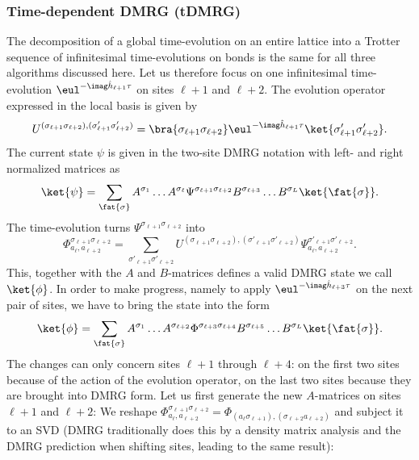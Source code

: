 \subsubsection{Time-dependent DMRG (tDMRG)}
The decomposition of a global time-evolution on an entire lattice into a Trotter sequence of infinitesimal time-evolutions on bonds is the same for all three algorithms discussed here.
Let us therefore focus on one infinitesimal time-evolution $\eul^{-\imag  \hat{h}_{\ell+1} \tau}$ on sites $\ell+1$ and $\ell+2$. 
The evolution operator expressed in the local basis is given by
\begin{equation}
U^{(\sigma_{\ell+1} \sigma_{\ell+2}), (\sigma'_{\ell+1} \sigma'_{\ell+2})} = \bra{\sigma_{\ell+1} \sigma_{\ell+2}} \eul^{-\imag  \hat{h}_{\ell+1} \tau} \ket{\sigma'_{\ell+1} \sigma'_{\ell+2}} .
\end{equation}
The current state $\psi$ is given in the two-site DMRG notation with left- and right normalized matrices as
\begin{equation}
\ket{\psi} = \sum_{\fat{\sigma}} A^{\sigma_1} \ldots A^{\sigma_\ell} \Psi^{\sigma_{\ell+1}\sigma_{\ell+2}} B^{\sigma_{\ell+3}} \ldots B^{\sigma_L} \ket{\fat{\sigma}} .
\end{equation}
The time-evolution turns $\Psi^{\sigma_{\ell+1}\sigma_{\ell+2}}$ into
\begin{equation}
\Phi^{\sigma_{\ell+1}\sigma_{\ell+2}}_{a_\ell, a_{\ell+2}} = \sum_{\sigma'_{\ell+1} \sigma'_{\ell+2}}
U^{(\sigma_{\ell+1} \sigma_{\ell+2}), (\sigma'_{\ell+1} \sigma'_{\ell+2})}  \Psi^{\sigma'_{\ell+1}\sigma'_{\ell+2}}_{a_\ell, a_{\ell+2}} . 
\end{equation} 
This, together with the $A$ and $B$-matrices defines a valid DMRG state we call $\ket{\phi}$. In order to make progress, namely to apply $\eul^{-\imag  \hat{h}_{\ell+3} \tau}$ on the next pair of sites, we have to bring the state into the form 
\begin{equation}
\ket{\phi} = \sum_{\fat{\sigma}} A^{\sigma_1} \ldots A^{\sigma_{\ell+2}} \Phi^{\sigma_{\ell+3}\sigma_{\ell+4}} B^{\sigma_{\ell+5}} \ldots B^{\sigma_L} \ket{\fat{\sigma}} .
\end{equation}
The changes can only concern sites $\ell+1$ through $\ell+4$: on the first two sites because of the action of the evolution operator, on the last two sites because they are brought into DMRG form. Let us first generate the new $A$-matrices on sites $\ell+1$ and $\ell+2$: We reshape $\Phi^{\sigma_{\ell+1}\sigma_{\ell+2}}_{a_\ell, a_{\ell+2}} = \Phi_{(a_\ell \sigma_{\ell+1}), (\sigma_{\ell+2} a_{\ell+2})}$ and subject it to an SVD (DMRG traditionally does this by a density matrix analysis and the DMRG prediction when shifting sites, leading to the same result):
